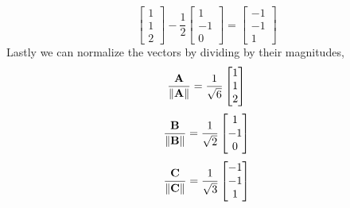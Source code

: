\begin{mdframed}[style=MyFrame]
\begin{equation}
\begin{bmatrix}
            1       \\
            1       \\
            2
        \end{bmatrix}
        -
        \frac{1}{2}
        \begin{bmatrix}
            1       \\
            -1      \\
            0
        \end{bmatrix}
        =
        \begin{bmatrix}
            -1      \\
            -1      \\
            1
        \end{bmatrix}
    \end{equation}
    Lastly we can normalize the vectors by dividing by their magnitudes,
    \begin{equation}
        \frac{\mathbf{A}}{\norm{\mathbf{A}}} =
            \frac{1}{\sqrt{6}}
            \begin{bmatrix}
                1       \\
                1       \\
                2
            \end{bmatrix}
    \end{equation}
    \begin{equation}
        \frac{\mathbf{B}}{\norm{\mathbf{B}}} =
            \frac{1}{\sqrt{2}}
            \begin{bmatrix}
                1       \\
                -1      \\
                0
            \end{bmatrix}
    \end{equation}
    \begin{equation}
        \frac{\mathbf{C}}{\norm{\mathbf{C}}} =
            \frac{1}{\sqrt{3}}
            \begin{bmatrix}
                -1      \\
                -1      \\
                1
            \end{bmatrix}
    \end{equation}
\end{mdframed}
